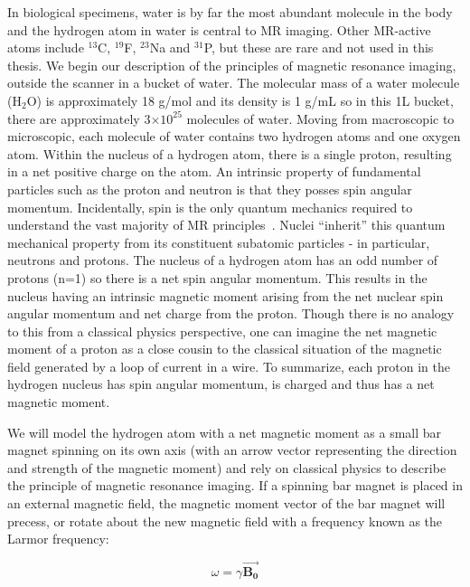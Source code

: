 In biological specimens, water is by far the most abundant molecule in the body and the hydrogen atom in water is central to MR imaging.
Other MR-active atoms include $^{13}$C, $^{19}$F, $^{23}$Na and $^{31}$P, but these are rare and not used in this thesis.
We begin our description of the principles of magnetic resonance imaging, outside the scanner in a bucket of water.
The molecular mass of a water molecule (H$_2$O) is approximately 18 g/mol and its density is 1 g/mL so in this 1L bucket, there are approximately 3$\times10^{25}$ molecules of water.
Moving from macroscopic to microscopic, each molecule of water contains two hydrogen atoms and one oxygen atom.
Within the nucleus of a hydrogen atom, there is a single proton, resulting in a net positive charge on the atom.
An intrinsic property of fundamental particles such as the proton and neutron is that they posses spin angular momentum.
Incidentally, spin is the only quantum mechanics required to understand the vast majority of MR principles~\cite{Hanson:2008tp}.
Nuclei ``inherit'' this quantum mechanical property from its constituent subatomic particles - in particular, neutrons and protons.
The nucleus of a hydrogen atom has an odd number of protons (n=1) so there is a net spin angular momentum.
This results in the nucleus having an intrinsic magnetic moment arising from the net nuclear spin angular momentum and net charge from the proton.
Though there is no analogy to this from a classical physics perspective, one can imagine the net magnetic moment of a proton as a close cousin to the classical situation of the magnetic field generated by a loop of current in a wire.
To summarize, each proton in the hydrogen nucleus has spin angular momentum, is charged and thus has a net magnetic moment.

We will model the hydrogen atom with a net magnetic moment as a small bar magnet spinning on its own axis (with an arrow vector representing the direction and strength of the magnetic moment) and rely on classical physics to describe the principle of magnetic resonance imaging. 
If a spinning bar magnet is placed in an external magnetic field, the magnetic moment vector of the bar magnet will precess, or rotate about the new magnetic field with a frequency known as the Larmor frequency:

\begin{equation}
	\omega = \gamma \vec{\mathbf{B_0}}
\end{equation}

